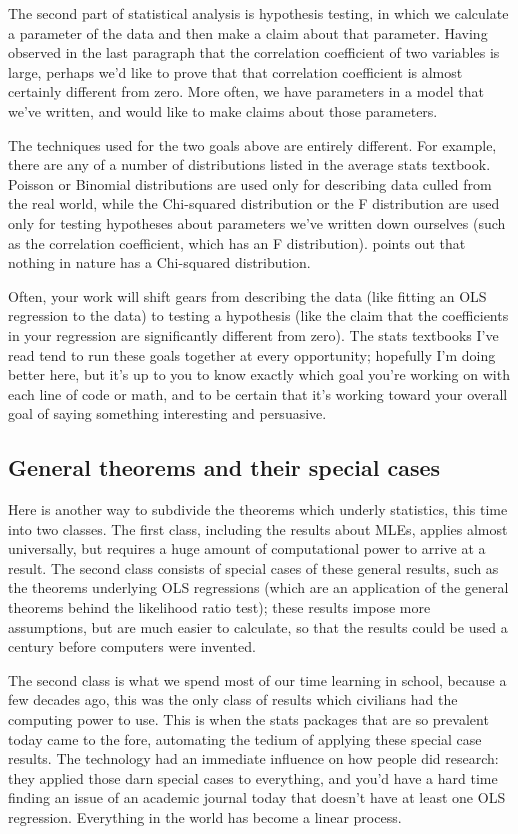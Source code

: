 \documentclass[12pt,notitlepage, openany]{book}
\begin{document}
The second part of statistical analysis is hypothesis testing, in which
we calculate a parameter of the data and then make a claim about that
parameter.  Having observed in the last paragraph that the correlation
coefficient of two variables is large, perhaps we'd like to prove
that that correlation coefficient is almost certainly different from
zero. More often, we have parameters in a model that we've written,
and would like to make claims about those parameters.

The techniques used for the two goals above are entirely different. For
example, there are any of a number of distributions listed in the
average stats textbook.  Poisson or Binomial distributions are used
only for describing data culled from the real world, while the Chi-squared
distribution or the F distribution are used only for testing hypotheses
about parameters we've written down ourselves (such as the correlation
coefficient, which has an F distribution). \cite{kmenta} points out that nothing
in nature has a Chi-squared distribution. 

Often, your work will shift
gears from describing the data (like fitting an OLS regression to the
data) to testing a hypothesis (like the claim that the coefficients
in your regression are significantly different from zero). The stats
textbooks I've read tend to run these goals together at every opportunity;
hopefully I'm doing better here, but it's up to you to know exactly
which goal you're working on with each line of code or math, and to be
certain that it's working toward your overall goal of saying something
interesting and persuasive.

\subsection{General theorems and their special cases}
Here is another way to subdivide the theorems which underly
statistics, this time into two classes. The first class, including the
results about MLEs, applies almost universally, but requires a huge
amount of computational power to arrive at a result. The second class
consists of special cases of these general results, such as the theorems
underlying OLS regressions (which are an application of the general
theorems behind the likelihood ratio test); these results impose more
assumptions, but are much easier to calculate, so that the results could
be used a century before computers were invented.

The second class is what we spend most of our time learning in school,
because a few decades ago, this was the only class of results which
civilians had the computing power to use. This is when the stats packages
that are so prevalent today came to the fore, automating the tedium of
applying these special case results. The technology had an immediate
influence on how people did research: they applied those darn special
cases to everything, and you'd have a hard time finding an issue of an
academic journal today that doesn't have at least one OLS regression.
Everything in the world has become a linear process.
\end{document}
